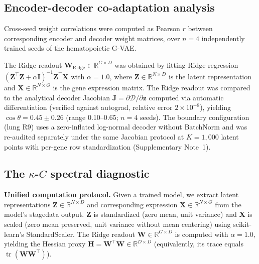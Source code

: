 \subsection*{Encoder-decoder co-adaptation analysis}

Cross-seed weight correlations were computed as Pearson $r$ between corresponding encoder and decoder weight matrices, over $n=4$ independently trained seeds of the hematopoietic G-VAE.

The Ridge readout $\mathbf{W}_{\text{Ridge}} \in \mathbb{R}^{G \times D}$ was obtained by fitting Ridge regression $(\mathbf{Z}^\top\mathbf{Z} + \alpha\mathbf{I})^{-1}\mathbf{Z}^\top\mathbf{X}$ with $\alpha=1.0$, where $\mathbf{Z} \in \mathbb{R}^{N \times D}$ is the latent representation and $\mathbf{X} \in \mathbb{R}^{N \times G}$ is the gene expression matrix. The Ridge readout was compared to the analytical decoder Jacobian $\mathbf{J} = \partial\mathcal{D}/\partial\mathbf{z}$ computed via automatic differentiation (verified against autograd, relative error $2\times10^{-8}$), yielding $\cos\theta = 0.45 \pm 0.26$ (range 0.10--0.65; $n=4$ seeds). The boundary configuration (lung R9) uses a zero-inflated log-normal decoder without BatchNorm and was re-audited separately under the same Jacobian protocol at $K=1{,}000$ latent points with per-gene row standardization (Supplementary Note~1).

\subsection*{The $\kappa$-$C$ spectral diagnostic}

\textbf{Unified computation protocol.} Given a trained model, we extract latent representations $\mathbf{Z} \in \mathbb{R}^{N \times D}$ and corresponding expression $\mathbf{X} \in \mathbb{R}^{N \times G}$ from the model's stagedata output. $\mathbf{Z}$ is standardized (zero mean, unit variance) and $\mathbf{X}$ is scaled (zero mean preserved, unit variance without mean centering) using scikit-learn's StandardScaler. The Ridge readout $\mathbf{W} \in \mathbb{R}^{G \times D}$ is computed with $\alpha=1.0$, yielding the Hessian proxy $\mathbf{H} = \mathbf{W}^\top\mathbf{W} \in \mathbb{R}^{D \times D}$ (equivalently, its trace equals $\operatorname{tr}(\mathbf{W}\mathbf{W}^\top)$).

